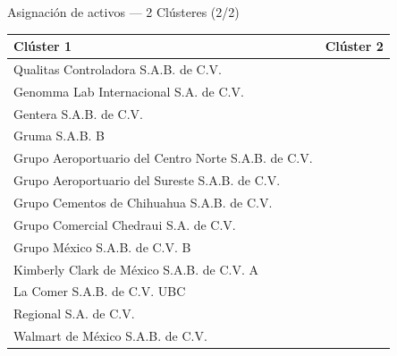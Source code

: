 \documentclass[aspectratio=169,xcolor=dvipsnames]{beamer}
\begin{document}
\begin{frame}{Asignación de activos — 2 Clústeres (2/2)}
    \small

    \begin{tabularx}{\textwidth}{@{}X X@{}}
        \toprule
        \textbf{Clúster 1} & \textbf{Clúster 2} \\
        \midrule
        Qualitas Controladora S.A.B. de C.V. & \\
        Genomma Lab Internacional S.A. de C.V. & \\
        Gentera S.A.B. de C.V. & \\
        Gruma S.A.B. B & \\
        Grupo Aeroportuario del Centro Norte S.A.B. de C.V. & \\
        Grupo Aeroportuario del Sureste S.A.B. de C.V. & \\
        Grupo Cementos de Chihuahua S.A.B. de C.V. & \\
        Grupo Comercial Chedraui S.A. de C.V. & \\
        Grupo México S.A.B. de C.V. B & \\
        Kimberly Clark de México S.A.B. de C.V. A & \\
        La Comer S.A.B. de C.V. UBC & \\
        Regional S.A. de C.V. &  \\
        Walmart de México S.A.B. de C.V. & \\
        \bottomrule
    \end{tabularx}
\end{frame}
\end{document}
